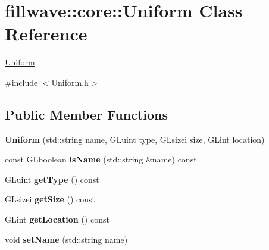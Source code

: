 \hypertarget{classfillwave_1_1core_1_1Uniform}{}\section{fillwave\+:\+:core\+:\+:Uniform Class Reference}
\label{classfillwave_1_1core_1_1Uniform}


\hyperlink{classfillwave_1_1core_1_1Uniform}{Uniform}.  




{\ttfamily \#include $<$Uniform.\+h$>$}

\subsection*{Public Member Functions}
\begin{DoxyCompactItemize}
\item 
\hypertarget{classfillwave_1_1core_1_1Uniform_a3937b3732ff724ba8767bb9d80fb122d}{}{\bfseries Uniform} (std\+::string name, G\+Luint type, G\+Lsizei size, G\+Lint location)\label{classfillwave_1_1core_1_1Uniform_a3937b3732ff724ba8767bb9d80fb122d}

\item 
\hypertarget{classfillwave_1_1core_1_1Uniform_a6dbfc634696941c77f195c07bc211cb4}{}const G\+Lboolean {\bfseries is\+Name} (std\+::string \&name) const \label{classfillwave_1_1core_1_1Uniform_a6dbfc634696941c77f195c07bc211cb4}

\item 
\hypertarget{classfillwave_1_1core_1_1Uniform_afc8f9ab89e7c63449e27e6128841115f}{}G\+Luint {\bfseries get\+Type} () const \label{classfillwave_1_1core_1_1Uniform_afc8f9ab89e7c63449e27e6128841115f}

\item 
\hypertarget{classfillwave_1_1core_1_1Uniform_a38bc20ce3766f8bb9bd69d232e159366}{}G\+Lsizei {\bfseries get\+Size} () const \label{classfillwave_1_1core_1_1Uniform_a38bc20ce3766f8bb9bd69d232e159366}

\item 
\hypertarget{classfillwave_1_1core_1_1Uniform_a675676f7eb30fa6727656a16e972c698}{}G\+Lint {\bfseries get\+Location} () const \label{classfillwave_1_1core_1_1Uniform_a675676f7eb30fa6727656a16e972c698}

\item 
\hypertarget{classfillwave_1_1core_1_1Uniform_a1e759add03c0a0f139b7c0a3efbbe3e1}{}void {\bfseries set\+Name} (std\+::string name)\label{classfillwave_1_1core_1_1Uniform_a1e759add03c0a0f139b7c0a3efbbe3e1}


\end{DoxyCompactItemize}
